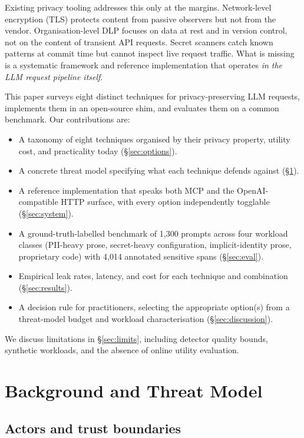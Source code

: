 \documentclass[11pt,a4paper]{article}
\begin{document}
Existing privacy tooling addresses this only at the margins.
Network-level encryption (TLS) protects content from passive
observers but not from the vendor. Organisation-level DLP focuses
on data at rest and in version control, not on the content of
transient API requests. Secret scanners catch known patterns at
commit time but cannot inspect live request traffic. What is
missing is a systematic framework and reference implementation
that operates \emph{in the LLM request pipeline itself}.

This paper surveys eight distinct techniques for privacy-preserving
LLM requests, implements them in an open-source shim, and
evaluates them on a common benchmark. Our contributions are:

\begin{itemize}
  \item A taxonomy of eight techniques organised by their privacy
    property, utility cost, and practicality today
    (\S\ref{sec:options}).
  \item A concrete threat model specifying what each technique
    defends against (\S\ref{sec:threat}).
  \item A reference implementation that speaks both MCP and the
    OpenAI-compatible HTTP surface, with every option
    independently togglable (\S\ref{sec:system}).
  \item A ground-truth-labelled benchmark of 1{,}300 prompts across
    four workload classes (PII-heavy prose, secret-heavy configuration,
    implicit-identity prose, proprietary code) with 4{,}014
    annotated sensitive spans (\S\ref{sec:eval}).
  \item Empirical leak rates, latency, and cost for each technique
    and combination (\S\ref{sec:results}).
  \item A decision rule for practitioners, selecting the
    appropriate option(s) from a threat-model budget and workload
    characterisation (\S\ref{sec:discussion}).
\end{itemize}

\noindent We discuss limitations in \S\ref{sec:limits}, including
detector quality bounds, synthetic workloads, and the absence of
online utility evaluation.

\section{Background and Threat Model}
\label{sec:threat}

\subsection{Actors and trust boundaries}
\end{document}
